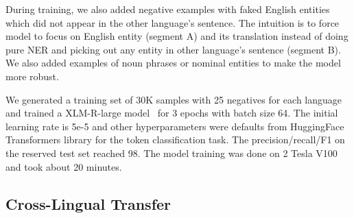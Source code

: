 \documentclass[11pt]{article}
\begin{document}
During training, we also added negative examples with faked English entities which did not appear in the other language's sentence. The intuition is to force model to focus on English entity (segment A) and its translation instead of doing pure NER and picking out any entity in other language's sentence (segment B). We also added examples of noun phrases or nominal entities to make the model more robust.

We generated a training set of 30K samples with 25 negatives for each language and trained a XLM-R-large model~\cite{Conneau2020} for 3 epochs with batch size 64. The initial learning rate is 5e-5 and other hyperparameters were defaults from HuggingFace Transformers library for the token classification task. The precision/recall/F1 on the reserved test set reached 98. The model training was done on 2 Tesla V100 and took about 20 minutes.

\subsection{Cross-Lingual Transfer}
\end{document}
